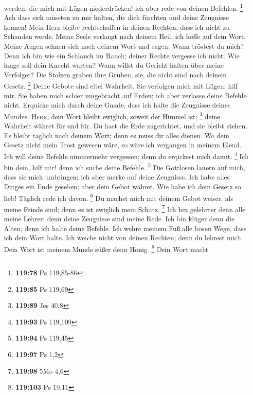 werden, die mich mit Lügen niederdrücken! ich aber rede von deinen
Befehlen. \footnote{\textbf{119:78} Ps 119,85-86}  Ach
dass sich müssten zu mir halten, die dich fürchten und deine Zeugnisse
kennen!  Mein Herz bleibe rechtschaffen in deinen
Rechten, dass ich nicht zu Schanden werde.  Meine Seele
verlangt nach deinem Heil; ich hoffe auf dein Wort. 
Meine Augen sehnen sich nach deinem Wort und sagen: Wann tröstest du
mich?  Denn ich bin wie ein Schlauch im Rauch; deiner
Rechte vergesse ich nicht.  Wie lange soll dein Knecht
warten? Wann willst du Gericht halten über meine Verfolger?
 Die Stolzen graben ihre Gruben, sie, die nicht sind nach
deinem Gesetz. \footnote{\textbf{119:85} Ps 119,69} 
Deine Gebote sind eitel Wahrheit. Sie verfolgen mich mit Lügen; hilf
mir.  Sie haben mich schier umgebracht auf Erden; ich
aber verlasse deine Befehle nicht.  Erquicke mich durch
deine Gnade, dass ich halte die Zeugnisse deines Mundes. 
\textsc{Herr}, dein Wort bleibt ewiglich, soweit der Himmel ist;
\footnote{\textbf{119:89} Jes 40,8}  deine Wahrheit
währet für und für. Du hast die Erde zugerichtet, und sie bleibt stehen.
 Es bleibt täglich nach deinem Wort; denn es muss dir
alles dienen.  Wo dein Gesetz nicht mein Trost gewesen
wäre, so wäre ich vergangen in meinem Elend.  Ich will
deine Befehle nimmermehr vergessen; denn du erqickest mich damit.
\footnote{\textbf{119:93} Ps 119,109}  Ich bin dein, hilf
mir! denn ich suche deine Befehle. \footnote{\textbf{119:94} Ps 119,45}
 Die Gottlosen lauern auf mich, dass sie mich umbringen;
ich aber merke auf deine Zeugnisse.  Ich habe alles
Dinges ein Ende gesehen; aber dein Gebot währet.  Wie
habe ich dein Gesetz so lieb! Täglich rede ich davon. \footnote{\textbf{119:97}
  Ps 1,2}  Du machst mich mit deinem Gebot weiser, als
meine Feinde sind; denn es ist ewiglich mein Schatz. \footnote{\textbf{119:98}
  5Mo 4,6}  Ich bin gelehrter denn alle meine Lehrer;
denn deine Zeugnisse sind meine Rede.  Ich bin klüger
denn die Alten; denn ich halte deine Befehle.  Ich wehre
meinem Fuß alle bösen Wege, dass ich dein Wort halte. 
Ich weiche nicht von deinen Rechten; denn du lehrest mich.
 Dein Wort ist meinem Munde süßer denn Honig.
\footnote{\textbf{119:103} Ps 19,11}  Dein Wort macht
